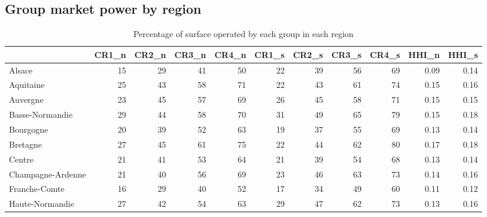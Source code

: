 \documentclass[11pt]{article}
\begin{document}
\subsection{Group market power by region}

\begin{table}[H]
\caption{Percentage of surface operated by each group in each region}
\footnotesize
\setlength{\tabcolsep}{2pt}

\begin{tabular}{lrrrrrrrrrr}
\toprule
{} &      CR1\_n &      CR2\_n &      CR3\_n &      CR4\_n &      CR1\_s &      CR2\_s &      CR3\_s &      CR4\_s &      HHI\_n &      HHI\_s \\
\midrule
Alsace               &         15 &         29 &         41 &         50 &         22 &         39 &         56 &         69 &       0.09 &       0.14 \\
Aquitaine            &         25 &         43 &         58 &         71 &         22 &         43 &         61 &         74 &       0.15 &       0.16 \\
Auvergne             &         23 &         45 &         57 &         69 &         26 &         45 &         58 &         71 &       0.15 &       0.15 \\
Basse-Normandie      &         29 &         44 &         58 &         70 &         31 &         49 &         65 &         79 &       0.15 &       0.18 \\
Bourgogne            &         20 &         39 &         52 &         63 &         19 &         37 &         55 &         69 &       0.13 &       0.14 \\
Bretagne             &         27 &         45 &         61 &         75 &         22 &         44 &         62 &         80 &       0.17 &       0.18 \\
Centre               &         21 &         41 &         53 &         64 &         21 &         39 &         54 &         68 &       0.13 &       0.14 \\
Champagne-Ardenne    &         21 &         40 &         56 &         69 &         23 &         46 &         63 &         73 &       0.14 &       0.16 \\
Franche-Comte        &         16 &         29 &         40 &         52 &         17 &         34 &         49 &         60 &       0.11 &       0.12 \\
Haute-Normandie      &         27 &         42 &         54 &         63 &         29 &         47 &         62 &         73 &       0.13 &       0.16 \\

\end{tabular}
\end{table}
\end{document}
